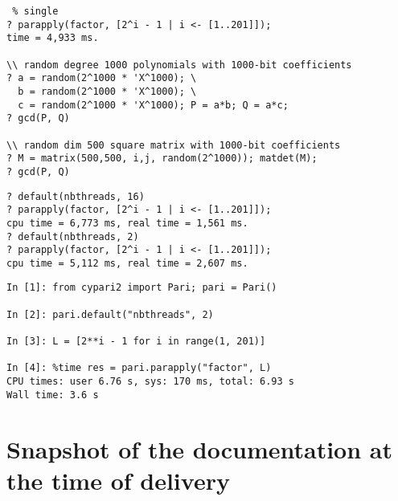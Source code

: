 \documentclass{deliverablereport}
\begin{document}
\begin{verbatim} % single
? parapply(factor, [2^i - 1 | i <- [1..201]]);
time = 4,933 ms.

\\ random degree 1000 polynomials with 1000-bit coefficients
? a = random(2^1000 * 'X^1000); \
  b = random(2^1000 * 'X^1000); \
  c = random(2^1000 * 'X^1000); P = a*b; Q = a*c;
? gcd(P, Q)

\\ random dim 500 square matrix with 1000-bit coefficients
? M = matrix(500,500, i,j, random(2^1000)); matdet(M);
? gcd(P, Q)
\end{verbatim}

\begin{verbatim}
? default(nbthreads, 16)
? parapply(factor, [2^i - 1 | i <- [1..201]]);
cpu time = 6,773 ms, real time = 1,561 ms.
? default(nbthreads, 2)
? parapply(factor, [2^i - 1 | i <- [1..201]]);
cpu time = 5,112 ms, real time = 2,607 ms.
\end{verbatim}

\begin{verbatim}
In [1]: from cypari2 import Pari; pari = Pari()

In [2]: pari.default("nbthreads", 2)

In [3]: L = [2**i - 1 for i in range(1, 201)]

In [4]: %time res = pari.parapply("factor", L)
CPU times: user 6.76 s, sys: 170 ms, total: 6.93 s
Wall time: 3.6 s
\end{verbatim}

\appendix

\section{Snapshot of the documentation at the time of delivery}


\end{document}
